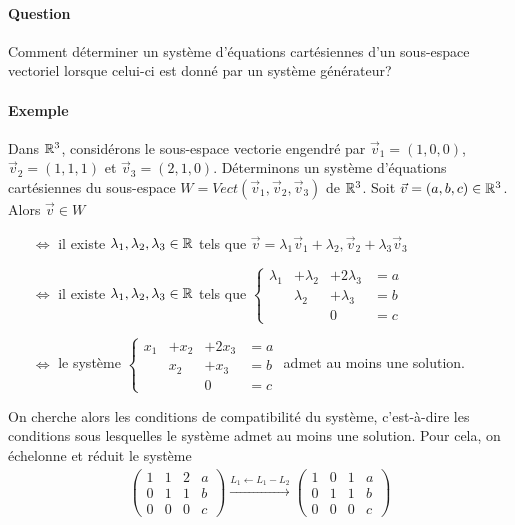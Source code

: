 \paragraph{Question} Comment déterminer un système d'équations cartésiennes d'un sous-espace vectoriel lorsque celui-ci est donné par un système générateur?

\paragraph{Exemple} Dans $\mathbb{R}^3$, considérons le sous-espace vectorie engendré par $\vec{v}_1 = (1, 0, 0)$, $\vec{v}_2 = (1, 1, 1)$ et $\vec{v}_3 = (2, 1, 0)$. Déterminons un système d'équations cartésiennes du sous-espace $W = Vect(\vec{v}_1, \vec{v}_2, \vec{v}_3)$ de $\mathbb{R}^3$. Soit $\vec{v} = (a, b, c) \in \mathbb{R}^3$. \\
Alors $\vec{v} \in W$ 
\begin{itemize}
  \item[$\Leftrightarrow$] il existe $\lambda_1, \lambda_2, \lambda_3 \in \mathbb{R}$ tels que $\vec{v} = \lambda_1 \vec{v}_1 + \lambda_2, \vec{v}_2 + \lambda_3 \vec{v}_3$ 
  \item[$\Leftrightarrow$] il existe $\lambda_1, \lambda_2, \lambda_3 \in \mathbb{R}$ tels que 
    $\left\{ \begin{array}{rrrc}
       \lambda_1 & + \lambda_2 & + 2 \lambda_3 & = a \\
       & \lambda_2 & + \lambda_3 & = b \\
       &  & 0 & = c
    \end{array} \right. $
  \item [$\Leftrightarrow$] le système 
    $\left\{ \begin{array}{rrrc}
      x_1 & + x_2 & + 2 x_3 & = a \\
       & x_2 & + x_3 & = b \\
       &  & 0 & = c
    \end{array} \right. $ admet au moins une solution.
\end{itemize}
On cherche alors les conditions de compatibilité du système, c'est-à-dire les conditions sous lesquelles le système admet au moins une solution. Pour cela, on échelonne et réduit le système
\begin{eqnarray*}
  \begin{pmatrix}
    1 & 1 & 2 & a \\
    0 & 1 & 1 & b \\
    0 & 0 & 0 & c
  \end{pmatrix}
  \xrightarrow{L_1 \leftarrow L_1 - L_2} 
  \begin{pmatrix}
    1 & 0 & 1 & a \\
    0 & 1 & 1 & b \\
    0 & 0 & 0 & c
  \end{pmatrix}
\end{eqnarray*}
